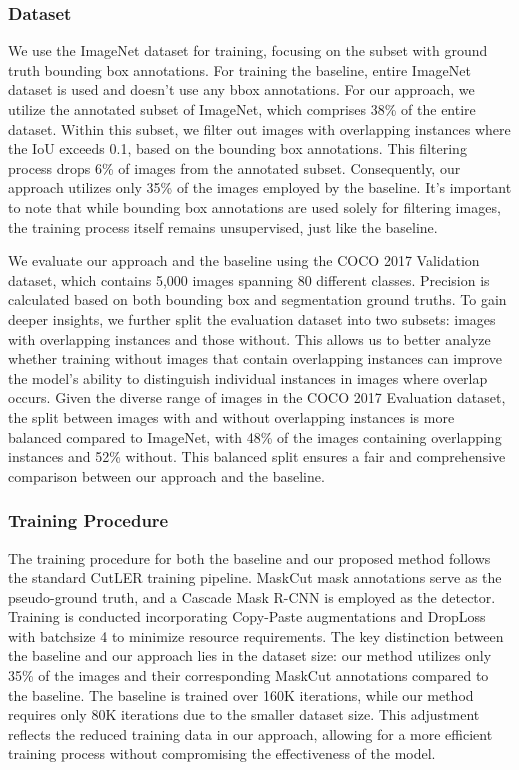 \subsubsection{Dataset}
We use the ImageNet dataset for training, focusing on the subset with ground truth bounding box annotations. For training the baseline, entire ImageNet dataset is used and doesn't use any bbox annotations. For our approach, we utilize the annotated subset of ImageNet, which comprises 38\% of the entire dataset. Within this subset, we filter out images with overlapping instances where the IoU exceeds 0.1, based on the bounding box annotations. This filtering process drops 6\% of images from the annotated subset. Consequently, our approach utilizes only 35\% of the images employed by the baseline. It's important to note that while bounding box annotations are used solely for filtering images, the training process itself remains unsupervised, just like the baseline.

We evaluate our approach and the baseline using the COCO 2017 Validation dataset, which contains 5,000 images spanning 80 different classes. Precision is calculated based on both bounding box and segmentation ground truths. To gain deeper insights, we further split the evaluation dataset into two subsets: images with overlapping instances and those without. This allows us to better analyze whether training without images that contain overlapping instances can improve the model's ability to distinguish individual instances in images where overlap occurs. Given the diverse range of images in the COCO 2017 Evaluation dataset, the split between images with and without overlapping instances is more balanced compared to ImageNet, with 48\% of the images containing overlapping instances and 52\% without. This balanced split ensures a fair and comprehensive comparison between our approach and the baseline.

\subsubsection{Training Procedure}
The training procedure for both the baseline and our proposed method follows the standard CutLER training pipeline. MaskCut mask annotations serve as the pseudo-ground truth, and a Cascade Mask R-CNN is employed as the detector. Training is conducted incorporating Copy-Paste augmentations and DropLoss with batchsize 4 to minimize resource requirements. The key distinction between the baseline and our approach lies in the dataset size: our method utilizes only 35\% of the images and their corresponding MaskCut annotations compared to the baseline. The baseline is trained over 160K iterations, while our method requires only 80K iterations due to the smaller dataset size. This adjustment reflects the reduced training data in our approach, allowing for a more efficient training process without compromising the effectiveness of the model.

